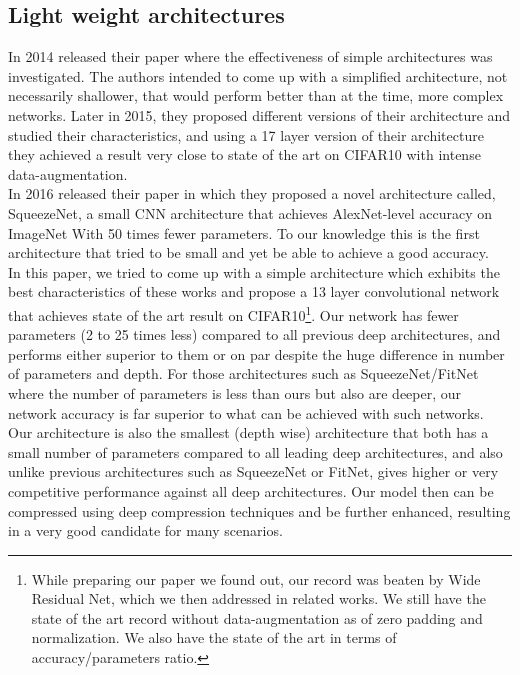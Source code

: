 \documentclass{article} \usepackage{lets_keepit_simple,times}
\begin{document}
\subsection{Light weight architectures} 
In 2014 \cite{Springenberg_StrivingForSimplicity_2014} released their paper where the effectiveness of simple architectures was investigated. The authors intended to come up with a simplified architecture, not necessarily shallower, that would perform better than at the time, more complex networks. Later in 2015, they proposed different versions of their architecture and studied their characteristics, and using a 17 layer version of their architecture they achieved a result very close to state of the art on CIFAR10 with intense data-augmentation.\\
In 2016 \cite{Iandola_squeezenet_2016} released their paper in which they proposed a novel architecture called, SqueezeNet, a small CNN architecture that achieves AlexNet-level accuracy on ImageNet With 50 times fewer parameters. To our knowledge this is the first architecture that tried to be small and yet be able to achieve a good accuracy.\\
In this paper, we tried to come up with a simple architecture which exhibits the best characteristics of these works and propose a 13 layer convolutional network that achieves state of the art result on CIFAR10\footnote{\small{While preparing our paper we found out, our record was beaten by Wide Residual Net, which we then addressed in related works. We still have the state of the art record without data-augmentation as of zero padding and normalization. We also have the state of the art in terms of accuracy/parameters ratio.}}. Our network has fewer parameters (2 to 25 times less) compared to all previous deep architectures, and performs either superior to them or on par despite the huge difference in number of parameters and depth. For those architectures such as SqueezeNet/FitNet where the number of parameters is less than ours but also are deeper, our network accuracy is far superior to what can be achieved with such networks. Our architecture is also the smallest (depth wise) architecture that both has a small number of parameters compared to all leading deep architectures, and also unlike previous architectures such as SqueezeNet or FitNet, gives higher or very competitive performance against all deep architectures. 
Our model then can be compressed using deep compression techniques and be further enhanced, resulting in a very good candidate for many scenarios. 
\end{document}
